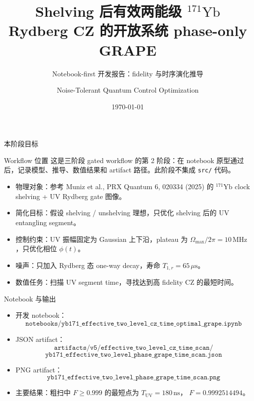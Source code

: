 \documentclass[aspectratio=169,11pt]{ctexbeamer}
\title[\texorpdfstring{$^{171}$Yb effective CZ GRAPE}{171Yb effective CZ GRAPE}]%
{Shelving 后有效两能级 \texorpdfstring{$^{171}\mathrm{Yb}$}{171Yb} Rydberg CZ 的开放系统 phase-only GRAPE}
\subtitle{Notebook-first 开发报告：fidelity 与时序演化推导}
\author{Noise-Tolerant Quantum Control Optimization}
\date{\today}
\newcommand{\OmegaMax}{\Omega_{\max}}
\begin{document}
\begin{frame}
  \titlepage
\end{frame}

\begin{frame}{本阶段目标}
  \begin{block}{Workflow 位置}
    这是三阶段 gated workflow 的第 2 阶段：在 notebook 原型通过后，记录模型、推导、数值结果和 artifact 路径。此阶段不集成 \texttt{src/} 代码。
  \end{block}

  \begin{itemize}
    \item 物理对象：参考 Muniz et al., PRX Quantum 6, 020334 (2025) 的 \({}^{171}\mathrm{Yb}\) clock shelving + UV Rydberg gate 图像。
    \item 简化目标：假设 shelving / unshelving 理想，只优化 shelving 后的 UV entangling segment。
    \item 控制约束：UV 振幅固定为 Gaussian 上下沿，plateau 为 \(\OmegaMax/2\pi=10\,\mathrm{MHz}\)，只优化相位 \(\phi(t)\)。
    \item 噪声：只加入 Rydberg 态 one-way decay，寿命 \(T_{1,r}=65\,\mu\mathrm{s}\)。
    \item 数值任务：扫描 UV segment time，寻找达到高 fidelity CZ 的最短时间。
  \end{itemize}
\end{frame}

\begin{frame}{Notebook 与输出}
  \begin{itemize}
    \item 开发 notebook：
      \[
      \texttt{notebooks/yb171\_effective\_two\_level\_cz\_time\_optimal\_grape.ipynb}
      \]
    \item JSON artifact：
      \[
      \texttt{artifacts/v5/effective\_two\_level\_cz\_time\_scan/}
      \]
      \[
      \texttt{yb171\_effective\_two\_level\_phase\_grape\_time\_scan.json}
      \]
    \item PNG artifact：
      \[
      \texttt{yb171\_effective\_two\_level\_phase\_grape\_time\_scan.png}
      \]
    \item 主要结果：粗扫中 \(F\ge 0.999\) 的最短点为 \(T_{\mathrm{UV}}=180\,\mathrm{ns}\)，
      \(F=0.9992514494\)。
  \end{itemize}
\end{frame}
\end{document}
